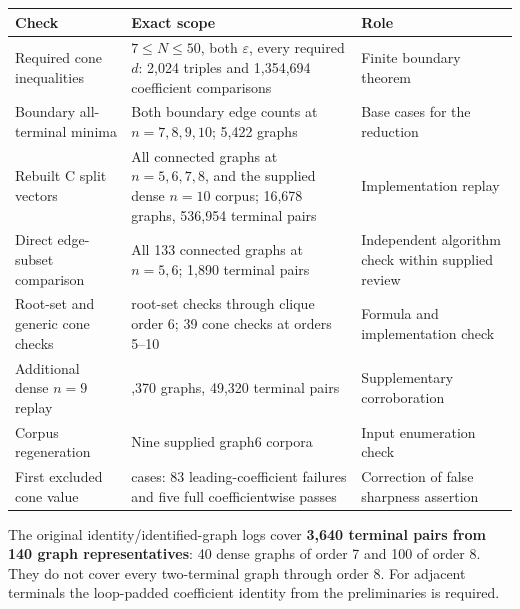 \documentclass[
  11pt,
]{article}
\newcounter{none} %
\theoremstyle{definition}
\theoremstyle{remark}
\begin{document}
{\def\LTcaptype{none} %
\begin{longtable}[]{@{}
  >{\raggedright\arraybackslash}p{}
  >{\raggedright\arraybackslash}p{}
  >{\raggedright\arraybackslash}p{}@{}}
\toprule\noalign{}
\begin{minipage}[b]{\linewidth}\raggedright
Check
\end{minipage} & \begin{minipage}[b]{\linewidth}\raggedright
Exact scope
\end{minipage} & \begin{minipage}[b]{\linewidth}\raggedright
Role
\end{minipage} \\
\midrule\noalign{}
\endhead
\bottomrule\noalign{}
\endlastfoot
Required cone inequalities & \(7\le N\le50\), both \(\varepsilon\),
every required \(d\): 2,024 triples and 1,354,694 coefficient
comparisons & Finite boundary theorem \\
Boundary all-terminal minima & Both boundary edge counts at
\(n=7,8,9,10\); 5,422 graphs & Base cases for the reduction \\
Rebuilt C split vectors & All connected graphs at \(n=5,6,7,8\), and the
supplied dense \(n=10\) corpus; 16,678 graphs, 536,954 terminal pairs &
Implementation replay \\
Direct edge-subset comparison & All 133 connected graphs at \(n=5,6\);
1,890 terminal pairs & Independent algorithm check within supplied
review \\
Root-set and generic cone checks & 21 root-set checks through clique
order 6; 39 cone checks at orders 5--10 & Formula and implementation
check \\
Additional dense \(n=9\) replay & 1,370 graphs, 49,320 terminal pairs &
Supplementary corroboration \\
Corpus regeneration & Nine supplied graph6 corpora & Input enumeration
check \\
First excluded cone value & 88 cases: 83 leading-coefficient failures
and five full coefficientwise passes & Correction of false sharpness
assertion \\
\end{longtable}
}

The original identity/identified-graph logs cover \textbf{3,640 terminal
pairs from 140 graph representatives}: 40 dense graphs of order 7 and
100 of order 8. They do not cover every two-terminal graph through order
8. For adjacent terminals the loop-padded coefficient identity from the
preliminaries is required.
\end{document}
